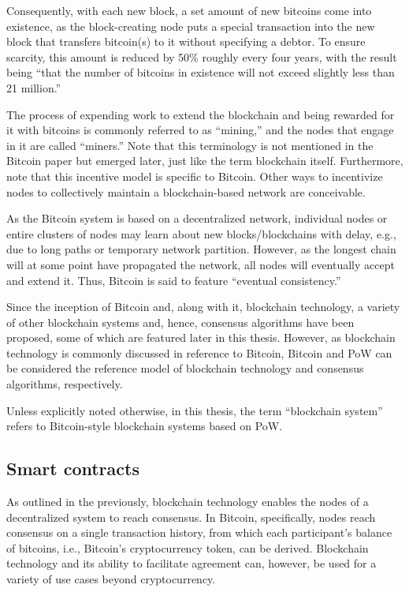 Consequently, with each new block, a set amount of new bitcoins come into existence, as the block-creating node puts a special transaction into the new block that transfers bitcoin(s) to it without specifying a debtor.
To ensure scarcity, this amount is reduced by 50\% roughly every four years, with the result being ``that the number of bitcoins in existence will not exceed slightly less than 21 million.'' \autocite{bitcoinit2020b}

The process of expending work to extend the blockchain and being rewarded for it with bitcoins is commonly referred to as ``mining,'' and the nodes that engage in it are called ``miners.''
Note that this terminology is not mentioned in the Bitcoin paper but emerged later, just like the term blockchain itself.
Furthermore, note that this incentive model is specific to Bitcoin.
Other ways to incentivize nodes to collectively maintain a blockchain-based network are conceivable.

As the Bitcoin system is based on a decentralized network, individual nodes or entire clusters of nodes may learn about new blocks/blockchains with delay, e.g., due to long paths or temporary network partition.
However, as the longest chain will at some point have propagated the network, all nodes will eventually accept and extend it.
Thus, Bitcoin is said to feature ``eventual consistency.'' \autocite[35]{bashir2020}

Since the inception of Bitcoin and, along with it, blockchain technology, a variety of other blockchain systems and, hence, consensus algorithms have been proposed, some of which are featured later in this thesis.
However, as blockchain technology is commonly discussed in reference to Bitcoin, Bitcoin and PoW can be considered the reference model of blockchain technology and consensus algorithms, respectively.

Unless explicitly noted otherwise, in this thesis, the term ``blockchain system'' refers to Bitcoin-style blockchain systems based on PoW. 

\subsection{Smart contracts}

As outlined in the previously, blockchain technology enables the nodes of a decentralized system to reach consensus.
In Bitcoin, specifically, nodes reach consensus on a single transaction history, from which each participant's balance of bitcoins, i.e., Bitcoin's cryptocurrency token, can be derived.
Blockchain technology and its ability to facilitate agreement can, however, be used for a variety of use cases beyond cryptocurrency.

